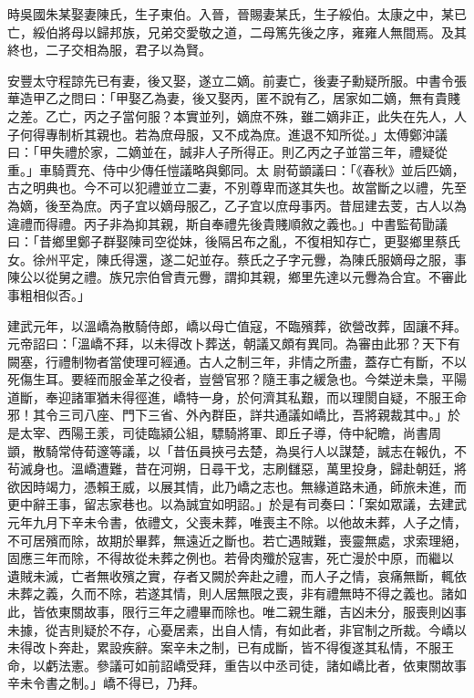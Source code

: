 \begin{pinyinscope}
 時吳國朱某娶妻陳氏，生子東伯。入晉，晉賜妻某氏，生子綏伯。太康之中，某已
 亡，綏伯將母以歸邦族，兄弟交愛敬之道，二母篤先後之序，雍雍人無間焉。及其終也，二子交相為服，君子以為賢。



 安豐太守程諒先已有妻，後又娶，遂立二嫡。前妻亡，後妻子勳疑所服。中書令張華造甲乙之問曰：「甲娶乙為妻，後又娶丙，匿不說有乙，居家如二嫡，無有貴賤之差。乙亡，丙之子當何服？本實並列，嫡庶不殊，雖二嫡非正，此失在先人，人子何得專制析其親也。若為庶母服，又不成為庶。進退不知所從。」太傅鄭沖議曰：「甲失禮於家，二嫡並在，誠非人子所得正。則乙丙之子並當三年，禮疑從重。」車騎賈充、侍中少傳任愷議略與鄭同。太
 尉荀顗議曰：「《春秋》並后匹嫡，古之明典也。今不可以犯禮並立二妻，不別尊卑而遂其失也。故當斷之以禮，先至為嫡，後至為庶。丙子宜以嫡母服乙，乙子宜以庶母事丙。昔屈建去芰，古人以為違禮而得禮。丙子非為抑其親，斯自奉禮先後貴賤順敘之義也。」中書監荀勖議曰：「昔鄉里鄭子群娶陳司空從妹，後隔呂布之亂，不復相知存亡，更娶鄉里蔡氏女。徐州平定，陳氏得還，遂二妃並存。蔡氏之子字元釁，為陳氏服嫡母之服，事陳公以從舅之禮。族兄宗伯曾責元釁，謂抑其親，鄉里先達以元釁為合宜。不審此事粗相似否。」



 建武元年，以溫嶠為散騎侍郎，嶠以母亡值寇，不臨殯葬，欲營改葬，固讓不拜。元帝詔曰：「溫嶠不拜，以未得改卜葬送，朝議又頗有異同。為審由此邪？天下有闕塞，行禮制物者當使理可經通。古人之制三年，非情之所盡，蓋存亡有斷，不以死傷生耳。要絰而服金革之役者，豈營官邪？隨王事之緩急也。今桀逆未梟，平陽道斷，奉迎諸軍猶未得徑進，嶠特一身，於何濟其私艱，而以理閡自疑，不服王命邪！其令三司八座、門下三省、外內群臣，詳共通議如嶠比，吾將親裁其中。」於是太宰、西陽王羕，司徒臨潁公組，驃騎將軍、即丘子導，侍中紀瞻，尚書周
 顗，散騎常侍荀邃等議，以「昔伍員挾弓去楚，為吳行人以謀楚，誠志在報仇，不茍滅身也。溫嶠遭難，昔在河朔，日尋干戈，志刷讎惡，萬里投身，歸赴朝廷，將欲因時竭力，憑賴王威，以展其情，此乃嶠之志也。無緣道路未通，師旅未進，而更中辭王事，留志家巷也。以為誠宜如明詔。」於是有司奏曰：「案如眾議，去建武元年九月下辛未令書，依禮文，父喪未葬，唯喪主不除。以他故未葬，人子之情，不可居殯而除，故期於畢葬，無遠近之斷也。若亡遇賊難，喪靈無處，求索理絕，固應三年而除，不得故從未葬之例也。若骨肉殲於寇害，死亡漫於中原，而繼以
 遺賊未滅，亡者無收殯之實，存者又闕於奔赴之禮，而人子之情，哀痛無斷，輒依未葬之義，久而不除，若遂其情，則人居無限之喪，非有禮無時不得之義也。諸如此，皆依東關故事，限行三年之禮畢而除也。唯二親生離，吉凶未分，服喪則凶事未據，從吉則疑於不存，心憂居素，出自人情，有如此者，非官制之所裁。今嶠以未得改卜奔赴，累設疾辭。案辛未之制，已有成斷，皆不得復遂其私情，不服王命，以虧法憲。參議可如前詔嶠受拜，重告以中丞司徒，諸如嶠比者，依東關故事辛未令書之制。」嶠不得已，乃拜。




\end{pinyinscope}
